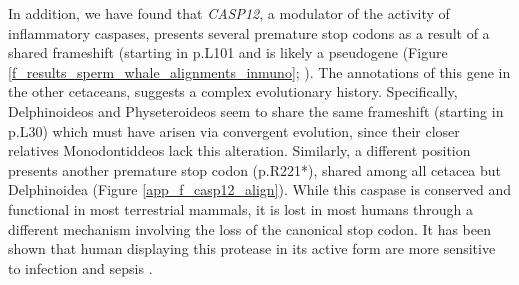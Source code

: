 In addition, we have found that \textit{CASP12}, a modulator of the activity of inflammatory caspases, presents several premature stop codons as a result of a shared frameshift (starting in {p.L101} and is likely a pseudogene (Figure \ref{f_results_sperm_whale_alignments_inmuno}; \cite{McIlwain2015}).
The annotations of this gene in the other cetaceans, suggests a complex evolutionary history. 
Specifically, Delphinoideos and Physeteroideos seem to share the same frameshift (starting in {p.L30}) which must have arisen via convergent evolution, since their closer relatives Monodontiddeos lack this alteration.
Similarly, a different position presents another premature stop codon ({p.R221*}), shared among all cetacea but Delphinoidea (Figure \ref{app_f_casp12_align}).
While this caspase is conserved and functional in most terrestrial mammals, it is lost in most humans through a different mechanism involving the loss of the canonical stop codon.
It has been shown that human displaying this protease in its active form are more sensitive to infection and sepsis \cite{Saleh2004}.

